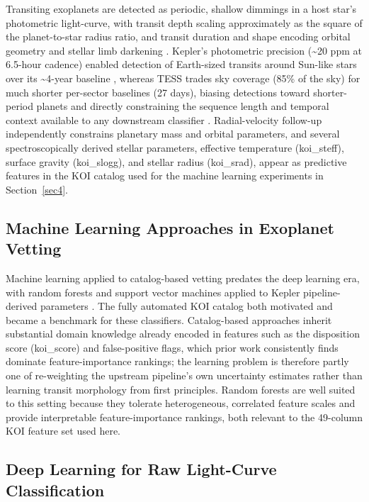 \documentclass[preprint,11pt,times]{elsarticle}
\begin{document}
Transiting exoplanets are detected as periodic, shallow dimmings in a host star's photometric light-curve, with transit depth scaling approximately as the square of the planet-to-star radius ratio, and transit duration and shape encoding orbital geometry and stellar limb darkening \cite{bib1}. Kepler's photometric precision (\textasciitilde20 ppm at 6.5-hour cadence) enabled detection of Earth-sized transits around Sun-like stars over its \textasciitilde4-year baseline \cite{bib1}, whereas TESS trades sky coverage (85\% of the sky) for much shorter per-sector baselines (27 days), biasing detections toward shorter-period planets and directly constraining the sequence length and temporal context available to any downstream classifier \cite{bib2}. Radial-velocity follow-up independently constrains planetary mass and orbital parameters, and several spectroscopically derived stellar parameters, effective temperature (koi\_steff), surface gravity (koi\_slogg), and stellar radius (koi\_srad), appear as predictive features in the KOI catalog used for the machine learning experiments in Section~\ref{sec4}.

\subsection{Machine Learning Approaches in Exoplanet Vetting}\label{subsec2b}

Machine learning applied to catalog-based vetting predates the deep learning era, with random forests and support vector machines applied to Kepler pipeline-derived parameters \cite{bib13}. The fully automated KOI catalog \cite{bib5} both motivated and became a benchmark for these classifiers. Catalog-based approaches inherit substantial domain knowledge already encoded in features such as the disposition score (koi\_score) and false-positive flags, which prior work consistently finds dominate feature-importance rankings; the learning problem is therefore partly one of re-weighting the upstream pipeline's own uncertainty estimates rather than learning transit morphology from first principles. Random forests are well suited to this setting because they tolerate heterogeneous, correlated feature scales and provide interpretable feature-importance rankings, both relevant to the 49-column KOI feature set used here.

\subsection{Deep Learning for Raw Light-Curve Classification}\label{subsec2c}
\end{document}
